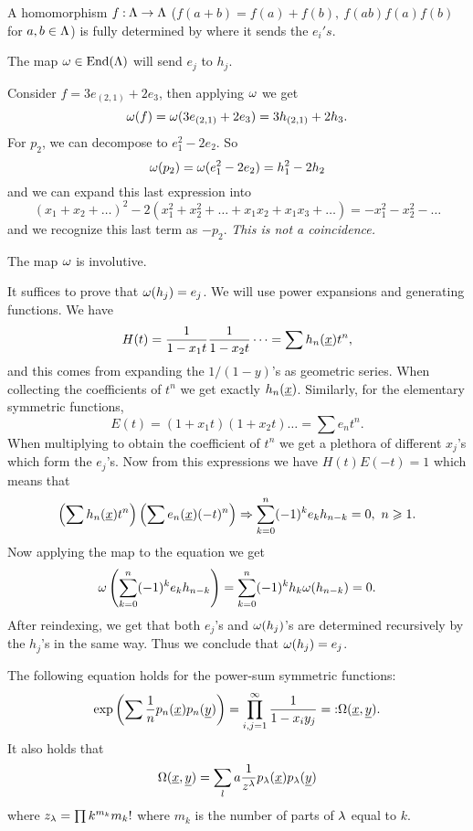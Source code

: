 \documentclass[12pt]{memoir}
\begin{document}
\begin{Prop}
    A homomorphism $f\mathbin{:}\Lambda\to\Lambda$ ($f(a+b)=f(a)+f(b),\ f(ab)f(a)f(b)$ for $a,b\in\Lambda$) is fully determined by where it sends the $e_i's$. 
\end{Prop}

\begin{Def}
    The map $\omega\in\operatorname{End}(\Lambda)$ will send $e_j$ to $h_j$. 
\end{Def}

\begin{Ex}
    Consider $f=3e_{(2,1)}+2e_3$, then applying $\omega$ we get 
    $$\omega(f)=\omega(3e_{(2,1)}+2e_3)=3h_{(2,1)}+2h_3.$$
    For $p_2$, we can decompose to $e_1^2-2e_2$. So 
    $$\omega(p_2)=\omega(e_1^2-2e_2)=h_1^2-2h_2$$
    and we can expand this last expression into 
    $$(x_1+x_2+\dots)^2-2(x_1^2+x_2^2+\dots+x_1x_2+x_1x_3+\dots)=-x_1^2-x_2^2-\dots$$
    and we recognize this last term as $-p_2$. \emph{This is not a coincidence.}
\end{Ex}

\begin{Th}
The map $\omega$ is involutive.
\end{Th}

\begin{ptcbp}
    It suffices to prove that $\omega(h_j)=e_j$. We will use power expansions and generating functions. We have 
    $$H(t)=\frac{1}{1-x_1t}\frac{1}{1-x_2t}\dots=\sum h_n(\underline x)t^n,$$
    and this comes from expanding the $1/(1-y)$'s as geometric series. When collecting the coefficients of $t^n$ we get exactly $h_n(\underline x)$. Similarly, for the elementary symmetric functions, 
    $$E(t)=(1+x_1t)(1+x_2t)\dots=\sum e_nt^n.$$
    When multiplying to obtain the coefficient of $t^n$ we get a plethora of different $x_j$'s which form the $e_j$'s. Now from this expressions we have $H(t)E(-t)=1$ which means that
    $$\left(\sum h_n(\underline x)t^n\right)\left(\sum e_n(\underline x)(-t)^n\right)\Rightarrow \sum_{k=0}^{n}(-1)^ke_kh_{n-k}=0,\ n\geqslant 1.$$
    Now applying the map to the equation we get 
    $$\omega\left(\sum_{k=0}^{n}(-1)^ke_kh_{n-k}\right)=\sum_{k=0}^{n}(-1)^kh_k\omega(h_{n-k})=0.$$
    After reindexing, we get that both $e_j$'s and $\omega(h_j)$'s are determined recursively by the $h_j$'s in the same way. Thus we conclude that $\omega(h_j)=e_j$. 
\end{ptcbp}

\begin{Lem}
    The following equation holds for the power-sum symmetric functions:
    $$\exp\left(\sum\frac{1}{n}p_n(\underline x)p_n(\underline y)\right)=\prod_{i,j=1}^\infty\frac{1}{1-x_iy_j}=\mathbin{:}\Omega(\underline x,\underline y).$$
    It also holds that 
    $$\Omega(\underline x,\underline y)=\sum_la\frac{1}{z^\lambda}p_\lambda(\underline x)p_\lambda(\underline y)$$
    where $z_\lambda=\prod k^{m_k}m_k!$ where $m_k$ is the number of parts of $\lambda$ equal to $k$. 
\end{Lem}
\end{document}
